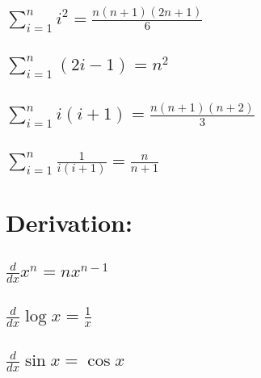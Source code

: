 \documentclass[27pt]{article}
\begin{document}
 \subsection{ $\displaystyle \sum_{i=1}^{n}{i^2}=\frac{n(n+1)(2n+1)}{6} $}
 \subsection{ $\displaystyle \sum_{i=1}^{n}(2i-1)={n^2} $}
 \subsection{ $\displaystyle \sum_{i=1}^{n}{i(i+1)}=\frac{n(n+1)(n+2)}{3} $}
 \subsection{ $\displaystyle \sum_{i=1}^{n}{\frac{1}{i(i+1)}}=\frac{n}{n+1} $}

\section{Derivation:}
  \subsection{$\frac{d}{dx} x^n= nx^{n-1}$}
  \subsection{$\frac{d}{dx} \log x= \frac{1}{x}$}
  \subsection{$\frac{d}{dx} \sin x= \cos x $}
\end{document}

